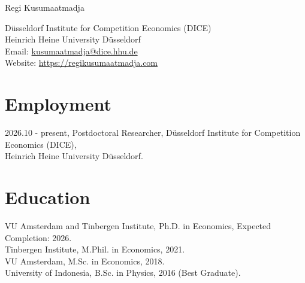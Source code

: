 \documentclass[10pt,letterpaper]{article}
\def\name{Regi Kusumaatmadja}
\begin{document}
\centerline{{\huge \name}}
\vspace{0.1in}
\vspace{0.25in}
\vspace{0.25in}
\begin{minipage}{\textwidth}
D\"usseldorf Institute for Competition Economics (DICE) \\
Heinrich Heine University D\"usseldorf \\
Email: \href{mailto:kusumaatmadja@dice.hhu.de}{kusumaatmadja@dice.hhu.de} \\
Website: \href{https://regikusumaatmadja.com}{https://regikusumaatmadja.com}
\end{minipage}
\section*{Employment}
2026.10 - present, Postdoctoral Researcher, D\"usseldorf Institute for Competition Economics (DICE), \\
Heinrich Heine University D\"usseldorf.
\section*{Education}
VU Amsterdam and Tinbergen Institute, Ph.D. in Economics, Expected Completion: 2026. \\
Tinbergen Institute, M.Phil. in Economics, 2021. \\
VU Amsterdam, M.Sc. in Economics, 2018. \\
University of Indonesia, B.Sc. in Physics, 2016 (Best Graduate).
\end{document}
